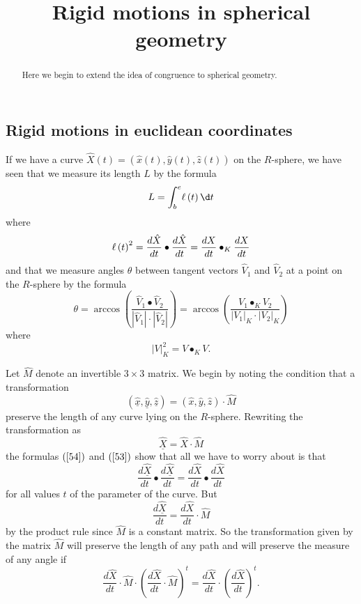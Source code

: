 \documentclass{ximera}
\title{Rigid motions in spherical geometry}
\begin{document}
\begin{abstract}
Here we begin to extend the idea of congruence to spherical geometry.
\end{abstract}
\maketitle

\subsection*{Rigid motions in euclidean coordinates}

If we have a curve $\hat{X}\left(  t\right)  =\left(  \hat{x}\left(  t\right)
,\hat{y}\left(  t\right)  ,\hat{z}\left(  t\right)  \right)  $ on the
$R$-sphere, we have seen that we measure its length $L$ by the formula%
\begin{equation}
L=%
{\displaystyle\int\nolimits_{b}^{e}}
\l\left(  t\right)  \d t \label{54}%
\end{equation}
where
\begin{equation}
\l\left(  t\right)  ^{2}=\frac{d\hat{X}}{dt}\bullet\frac{d\hat{X}}{dt}%
=\frac{dX}{dt}\bullet_{K}\frac{dX}{dt} \label{53}%
\end{equation}
and that we measure angles $\theta$ between tangent vectors $\hat{V}_{1}$ and
$\hat{V}_{2}$ at a point on the $R$-sphere by the formula%
\[
\theta=\arccos \left(  \frac{\hat{V}_{1}\bullet\hat{V}_{2}}{\left\vert
\hat{V}_{1}\right\vert \cdot \left\vert \hat{V}%
_{2}\right\vert }\right)  =\arccos \left(  \frac{V_{1}\bullet_{K}V_{2}%
}{\left\vert V_{1}\right\vert _{K}\cdot \left\vert
V_{2}\right\vert _{K}}\right)
\]
where%
\[
\left\vert V\right\vert _{K}^{2}=V\bullet_{K}V.
\]


Let $\hat{M}$ denote an invertible $3\times3$ matrix. We begin by noting the
condition that a transformation%
\[
\left(  \underline{\hat{x}},\underline{\hat{y}},\underline{\hat{z}}\right)
=\left(  \hat{x},\hat{y},\hat{z}\right)  \cdot\hat{M}%
\]
preserve the length of any curve lying on the $R$-sphere. Rewriting the
transformation as%
\begin{equation}
\underline{\hat{X}}=\hat{X}\cdot\hat{M} \label{trans1}%
\end{equation}
the formulas $\left(  \ref{54}\right)  $ and $\left(  \ref{53}\right)  $ show
that all we have to worry about is that%
\[
\frac{d\underline{\hat{X}}}{dt}\bullet\frac{d\underline{\hat{X}}}{dt}%
=\frac{d\hat{X}}{dt}\bullet\frac{d\hat{X}}{dt}%
\]
for all values $t$ of the parameter of the curve. But%
\begin{equation}
\frac{d\underline{\hat{X}}}{dt}=\frac{d\hat{X}}{dt}\cdot\hat{M} \label{trans2}%
\end{equation}
by the product rule since $\hat{M}$ is a constant matrix. So the
transformation given by the matrix $\hat{M}$ will preserve the length of any
path and will preserve the measure of any angle if%
\begin{equation}
\frac{d\hat{X}}{dt}\cdot\hat{M}\cdot\left(  \frac{d\hat{X}}{dt}\cdot\hat
{M}\right)  ^{t}=\frac{d\hat{X}}{dt}\cdot\left(  \frac{d\hat{X}}{dt}\right)
^{t}. \label{trans3}%
\end{equation}
\end{document}

